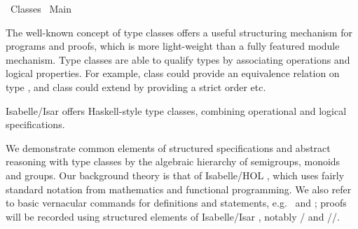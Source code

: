 %
\begin{isabellebody}%
\def\isabellecontext{Classes}%
%
\isadelimtheory
\isanewline
\isanewline
\isanewline
%
\endisadelimtheory
%
\isatagtheory
{}\isamarkupfalse%
\ Classes\isanewline
{}\ Main\isanewline
{}\isanewline
%
\endisatagtheory
{\isafoldtheory}%
%
\isadelimtheory
%
\endisadelimtheory
%
\isadelimML
%
\endisadelimML
%
\isatagML
%
\endisatagML
{\isafoldML}%
%
\isadelimML
%
\endisadelimML
%
\isamarkuptrue%
%
\isamarkuptrue%
%
\begin{isamarkuptext}%
The well-known concept of type classes
  \cite{wadler89how,peterson93implementing,hall96type,Nipkow-Prehofer:1993,Nipkow:1993,Wenzel:1997}
  offers a useful structuring mechanism for programs and proofs, which
  is more light-weight than a fully featured module mechanism.  Type
  classes are able to qualify types by associating operations and
  logical properties.  For example, class  could provide
  an equivalence relation \isa{{\isacharequal}} on type \isa{{\isasymalpha}}, and class
   could extend  by providing a strict order
  \isa{{\isacharless}} etc.

  Isabelle/Isar offers Haskell-style type classes, combining operational
  and logical specifications.%
\end{isamarkuptext}%
\isamarkuptrue%
%
\isamarkuptrue%
%
\begin{isamarkuptext}%
We demonstrate common elements of structured specifications and
  abstract reasoning with type classes by the algebraic hierarchy of
  semigroups, monoids and groups.  Our background theory is that of
  Isabelle/HOL \cite{Nipkow-et-al:2002:tutorial}, which uses fairly
  standard notation from mathematics and functional programming.  We
  also refer to basic vernacular commands for definitions and
  statements, e.g.\ \isa{{\isasymDEFINITION}} and \isa{{\isasymLEMMA}};
  proofs will be recorded using structured elements of Isabelle/Isar
  \cite{Wenzel-PhD,Nipkow:2002}, notably \isa{{\isasymPROOF}}/\isa{{\isasymQED}} and \isa{{\isasymFIX}}/\isa{{\isasymASSUME}}/\isa{{\isasymSHOW}}.


\end{isamarkuptext}
\end{isabellebody}
